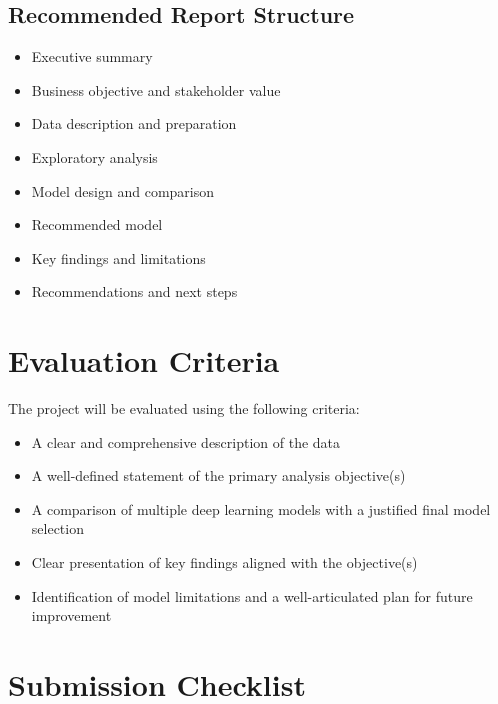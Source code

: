 \documentclass[11pt,letterpaper]{article}
\begin{document}
\subsection{Recommended Report Structure}

\begin{itemize}
  \item Executive summary
  \item Business objective and stakeholder value
  \item Data description and preparation
  \item Exploratory analysis
  \item Model design and comparison
  \item Recommended model
  \item Key findings and limitations
  \item Recommendations and next steps
\end{itemize}

\section{Evaluation Criteria}

The project will be evaluated using the following criteria:

\begin{itemize}
  \item A clear and comprehensive description of the data
  \item A well-defined statement of the primary analysis objective(s)
  \item A comparison of multiple deep learning models with a justified final
    model selection
  \item Clear presentation of key findings aligned with the objective(s)
  \item Identification of model limitations and a well-articulated plan for
    future improvement
\end{itemize}

\section{Submission Checklist}
\end{document}
